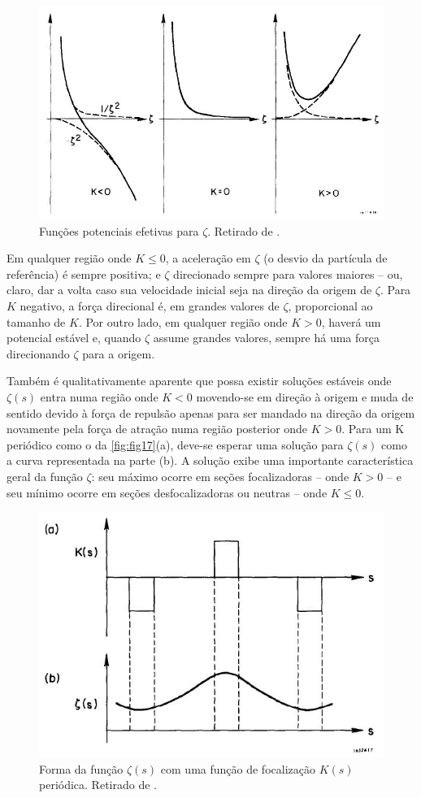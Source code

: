 \begin{figure}[!htb]
	\centering
	\includegraphics[width=0.9\linewidth]{./Figuras/fig16.jpeg}
	\caption{Funções potenciais efetivas para $\zeta$. Retirado de \cite{sands1970physics}.}
	\label{fig:fig16}
\end{figure}

Em qualquer região onde $K\leq 0$, a aceleração em $\zeta$ (o desvio da partícula de referência) é sempre positiva; e $\zeta$ direcionado sempre para valores maiores -- ou, claro, dar a volta caso sua velocidade inicial seja na direção da origem de $\zeta$. Para $K$ negativo, a força direcional é, em grandes valores de $\zeta$, proporcional ao tamanho de $K$. Por outro lado, em qualquer região onde $K>0$, haverá um potencial estável e, quando $\zeta$ assume grandes valores, sempre há uma força direcionando $\zeta$ para a origem.

Também é qualitativamente aparente que possa existir soluções estáveis onde $\zeta(s)$ entra numa região onde $K<0$ movendo-se em direção à origem e muda de sentido devido à força de repulsão apenas para ser mandado na direção da origem novamente pela força de atração numa região posterior onde $K>0$. Para um K periódico como o da \autoref{fig:fig17}(a), deve-se esperar uma solução para $\zeta(s)$ como a curva representada na parte (b). A solução exibe uma importante característica geral da função $\zeta$: seu máximo ocorre em seções focalizadoras -- onde $K>0$ -- e seu mínimo ocorre em seções desfocalizadoras ou neutras -- onde $K \leq 0$.

\begin{figure}[!htb]
	\centering
	\includegraphics[width=0.7\linewidth]{./Figuras/fig17.jpeg}
	\caption{Forma da função $\zeta(s)$ com uma função de focalização $K(s)$ periódica. Retirado de \cite{sands1970physics}.}
	\label{fig:fig17}
\end{figure}

